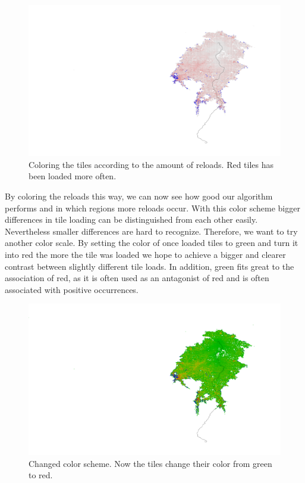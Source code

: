 \documentclass
[
	paper = a4,
    pagesize,
	12 pt,
	oneside,                       %
    open = right,
	DIV = calc,
	BCOR = 0 mm,                   %
	bibtotoc
]
{scrbook}
\begin{document}
\begin{figure}[H]
    \includegraphics[width=\textwidth]{Images/vis-rgb-cache.png}
\caption[]{Coloring the tiles according to the amount of reloads. Red tiles has been loaded more often.}
\label{fig:reload_coloring_white}
\end{figure}

By coloring the reloads this way, we can now see how good our algorithm performs and in which regions more reloads occur.
With this color scheme bigger differences in tile loading can be distinguished from each other easily.
Nevertheless smaller differences are hard to recognize.
Therefore, we want to try another color scale.
By setting the color of once loaded tiles to green and turn it into red the more the tile was loaded we hope to achieve a bigger and clearer contrast between slightly different tile loads.
In addition, green fits great to the association of red, as it is often used as an antagonist of red and is often associated with positive occurrences.

\begin{figure}[H]
    \includegraphics[width=\textwidth]{Images/vis-hsv-cache.png}
\caption[]{Changed color scheme. Now the tiles change their color from green to red.}
\label{fig:reload_coloring_hsv}
\end{figure}
\end{document}
